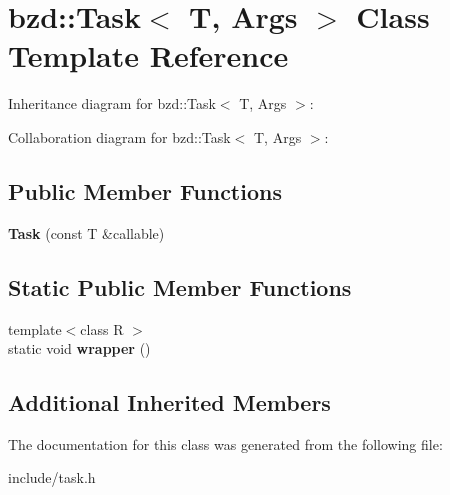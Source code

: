 \hypertarget{classbzd_1_1Task}{}\section{bzd\+:\+:Task$<$ T, Args $>$ Class Template Reference}
\label{classbzd_1_1Task}


Inheritance diagram for bzd\+:\+:Task$<$ T, Args $>$\+:


Collaboration diagram for bzd\+:\+:Task$<$ T, Args $>$\+:
\subsection*{Public Member Functions}
\begin{DoxyCompactItemize}
\item 
\mbox{\label{classbzd_1_1Task_a3601c729d02683a051e4549420a3e7c7}} 
{\bfseries Task} (const T \&callable)
\end{DoxyCompactItemize}
\subsection*{Static Public Member Functions}
\begin{DoxyCompactItemize}
\item 
\mbox{\label{classbzd_1_1Task_a4f868eef85a0999e2e7f522221b48c2f}} 
{\footnotesize template$<$class R $>$ }\\static void {\bfseries wrapper} ()
\end{DoxyCompactItemize}
\subsection*{Additional Inherited Members}


The documentation for this class was generated from the following file\+:\begin{DoxyCompactItemize}
\item 
include/task.\+h\end{DoxyCompactItemize}
